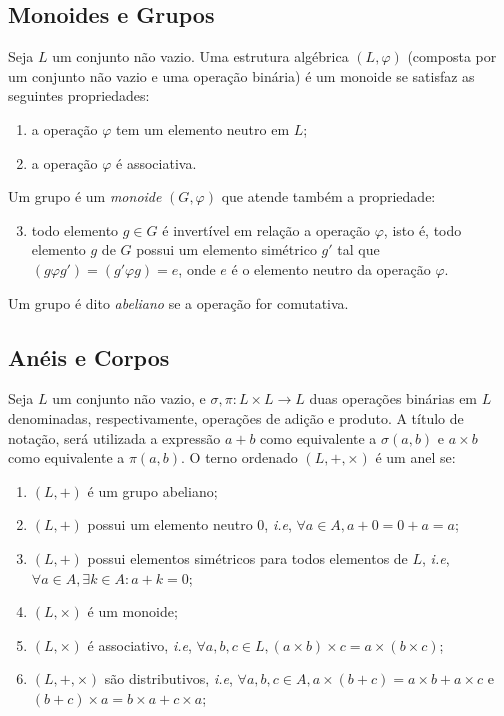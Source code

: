%
%
\subsection{Monoides e Grupos}
Seja \(L\) um conjunto não vazio. Uma estrutura algébrica \((L, \varphi )\) (composta por um conjunto não vazio e uma operação binária) é um monoide se satisfaz as seguintes propriedades:

\begin{enumerate}
  \item a operação \( \varphi \) tem um elemento neutro em \(L\);
  \item a operação \( \varphi \) é associativa.
\end{enumerate}

Um grupo é um \textit{monoide} \((G,  \varphi)\) que atende também a propriedade:
\begin{enumerate}
\setcounter{enumi}{2}
\item todo elemento \(g \in G\) é invertível em relação a operação \(\varphi\), isto é, todo elemento \(g\) de \(G\) possui um elemento simétrico \(g'\) tal que \((g \varphi g') = (g' \varphi g) = e \), onde \(e\) é o elemento neutro da operação \(\varphi\).
\end{enumerate}
Um grupo é dito \textit{abeliano} se a operação for comutativa.

%
%
\subsection{Anéis e Corpos}
 Seja \(L\) um conjunto não vazio, e \(\sigma, \pi:L \times L \to L\) duas operações binárias em \(L\) denominadas, respectivamente, operações de adição e produto. A título de notação, será utilizada a expressão \(a+b\) como equivalente a \(\sigma(a,b)\) e \(a \times b\) como equivalente a \(\pi(a,b)\). O terno ordenado \((L, +,\times )\) é um anel se:
\begin{enumerate}
  \item \((L, +)\) é um grupo abeliano;
  \item \((L, +)\) possui um elemento neutro $0$, \textit{i.e}, \(\forall a \in A, a + 0 = 0 + a = a\);
  \item \((L, +)\) possui elementos simétricos para todos elementos de $L$, \textit{i.e}, \(\forall a \in A, \exists k \in A: a + k = 0\);
  \item \((L, \times)\) é um monoide;
  \item \((L, \times)\) é associativo, \textit{i.e}, \(\forall a,b,c \in L, (a \times b) \times c = a \times (b \times c)\);
  \item \((L, +, \times)\) são distributivos, \textit{i.e}, \(\forall a,b,c \in A, a \times (b + c) = a \times b + a \times c\) e \((b + c) \times a = b \times a + c \times a\);
\end{enumerate}

